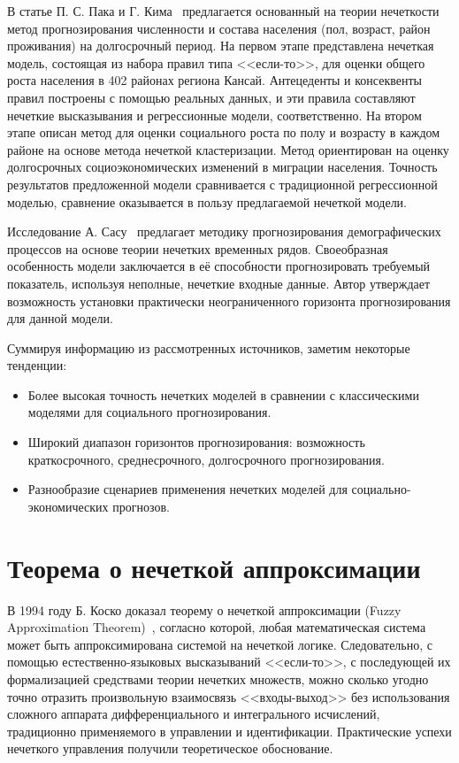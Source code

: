 В статье П. С. Пака и Г. Кима~\cite{Pak2005} предлагается основанный на теории
нечеткости метод прогнозирования численности и состава населения (пол, возраст,
район проживания) на долгосрочный период. На первом этапе представлена нечеткая
модель, состоящая из набора правил типа <<если-то>>, для оценки общего роста
населения в 402 районах региона Кансай. Антецеденты и консеквенты правил
построены с помощью реальных данных, и эти правила составляют нечеткие
высказывания и регрессионные модели, соответственно. На втором этапе описан
метод для оценки социального роста по полу и возрасту в каждом районе на основе
метода нечеткой кластеризации. Метод ориентирован на оценку долгосрочных
социоэкономических изменений в миграции населения. Точность результатов
предложенной модели сравнивается с традиционной регрессионной моделью, сравнение
оказывается в пользу предлагаемой нечеткой модели.   

Исследование А. Сасу~\cite{Sasu2010} предлагает методику прогнозирования
демографических процессов на основе теории нечетких временных рядов.
Своеобразная особенность модели заключается в её способности прогнозировать
требуемый показатель, используя неполные, нечеткие входные данные. Автор
утверждает возможность установки практически неограниченного горизонта
прогнозирования для данной модели.  

Суммируя информацию из рассмотренных источников, заметим некоторые тенденции:
\begin{itemize}
    \item Более высокая точность нечетких моделей в сравнении с классическими
        моделями для социального прогнозирования.
    \item Широкий диапазон горизонтов прогнозирования: возможность
        краткосрочного, среднесрочного, долгосрочного прогнозирования.
    \item Разнообразие сценариев применения нечетких моделей для
        социально-экономических прогнозов.
\end{itemize}
\section{Теорема о нечеткой аппроксимации}

В 1994 году Б. Коско  доказал теорему о нечеткой аппроксимации (Fuzzy
Approximation Theorem)~\cite{Kosko1994}, согласно которой, любая математическая
система может быть аппроксимирована системой на нечеткой логике. Следовательно,
с помощью естественно-языковых высказываний <<если-то>>, с последующей их
формализацией средствами теории нечетких множеств, можно сколько угодно точно
отразить произвольную взаимосвязь <<входы-выход>> без использования сложного
аппарата дифференциального и интегрального исчислений, традиционно применяемого
в управлении и идентификации. Практические успехи нечеткого управления получили
теоретическое обоснование. 


